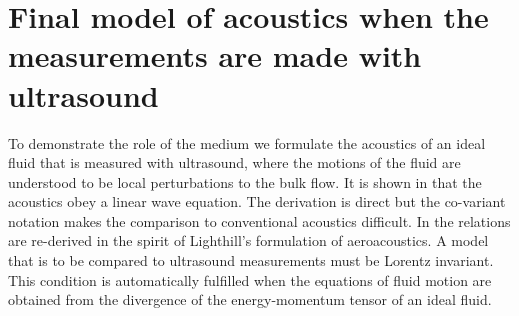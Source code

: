 


\section{Final model of acoustics when the measurements are made with ultrasound}\label{sec:Maxwell}

To demonstrate the role of the medium we formulate the acoustics of  an ideal fluid that is measured with ultrasound,
where the motions of the fluid are  understood to be local perturbations to the bulk flow.
It is shown in  that the acoustics  obey a linear wave equation.
The derivation is direct but the co-variant notation makes the comparison to conventional acoustics difficult.
In  the  relations are re-derived in the spirit of Lighthill's formulation of aeroacoustics.
%
%
A model that is to be compared to ultrasound measurements must be  Lorentz invariant.
This condition is  automatically fulfilled  when the equations of fluid motion are obtained from the  divergence of the energy-momentum tensor of an ideal fluid.


